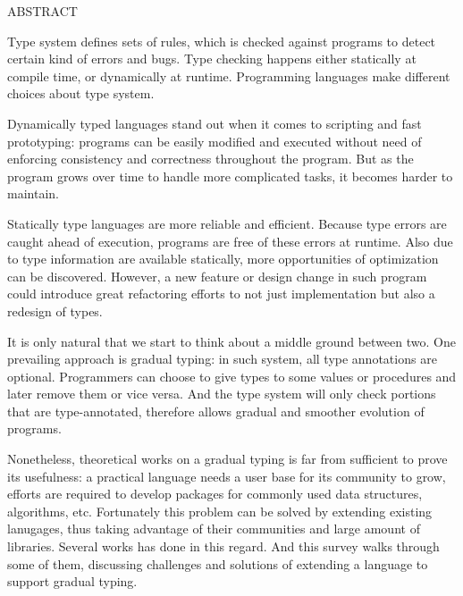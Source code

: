 \renewcommand{\baselinestretch}{1}
\small \normalsize

\begin{center}
\large{{ABSTRACT}}

\vspace{3em}

\end{center}
\hspace{-.15in}


\vspace{3em}

\renewcommand{\baselinestretch}{2}
\large \normalsize



Type system defines sets of rules, which is checked against programs to
detect certain kind of errors and bugs. Type checking happens either
statically at compile time, or dynamically at runtime. Programming languages
make different choices about type system.

Dynamically typed languages stand out when it comes to scripting and fast prototyping:
programs can be easily modified and executed without need of enforcing consistency and correctness throughout the program.
But as the program grows over time to handle more complicated tasks,
it becomes harder to maintain.

Statically type languages are more reliable and efficient.
Because type errors are caught ahead of execution,
programs are free of these errors at runtime.
Also due to type information are available statically,
more opportunities of optimization can be discovered.
However, a new feature or design change in such program could introduce
great refactoring efforts to not just implementation but also a redesign
of types.

It is only natural that we start to think about a middle ground
between two.
One prevailing approach is gradual typing: in such system,
all type annotations are optional. Programmers can choose to
give types to some values or procedures and later remove them or vice versa.
And the type system will only check portions that are type-annotated,
therefore allows gradual and smoother evolution of programs.

Nonetheless, theoretical works on a gradual typing is far from sufficient
to prove its usefulness: a practical language needs a user base for its community to grow,
efforts are required to develop packages for commonly used data structures, algorithms, etc. Fortunately this problem can be solved by extending existing lanugages,
thus taking advantage of their communities and large amount of libraries.
Several works has done in this regard. And this survey walks through some of them,
discussing challenges and solutions of extending a language to support gradual typing.